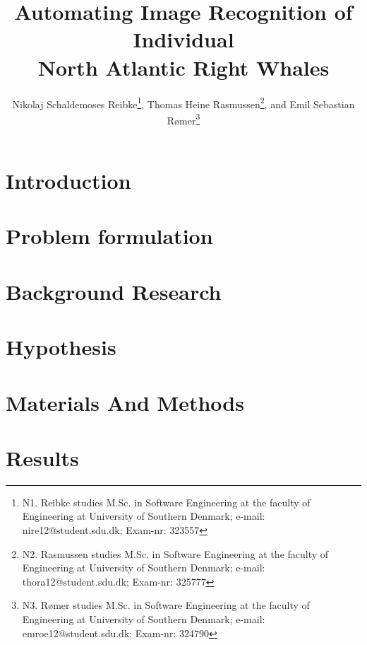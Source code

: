 \documentclass[10pt,a4paper,twocolumn]{article}
\begin{document}
\title{\textbf{Automating Image Recognition of Individual \\ North Atlantic Right Whales}}

\author{Nikolaj Schaldemoses Reibke\thanks{N1. Reibke studies M.Sc. in Software Engineering at the faculty of Engineering at University of Southern Denmark; e-mail: nire12@student.sdu.dk; Exam-nr: 323557},
		Thomas Heine Rasmussen\thanks{N2. Rasmussen studies M.Sc. in Software Engineering at the faculty of Engineering at University of Southern Denmark; e-mail: thora12@student.sdu.dk; Exam-nr: 325777},
        and Emil Sebastian R{\o}mer\thanks{N3. R{\o}mer studies M.Sc. in Software Engineering at the faculty of Engineering at University of Southern Denmark; e-mail: emroe12@student.sdu.dk; Exam-nr: 324790}
}

\maketitle

\begin{abstract}

\end{abstract}

\section{Introduction}


\section{Problem formulation}


\section{Background Research}


\section{Hypothesis}


\section{Materials And Methods}


\section{Results}

\end{document}

